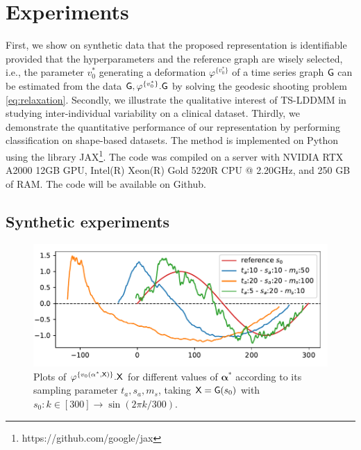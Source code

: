     




\section{Experiments}
\label{section:experiments}



First, we show on synthetic data that the proposed representation is identifiable provided that the hyperparameters and the reference graph are wisely selected, i.e.,
 the parameter $v_0^*$ generating a deformation $\varphi^{\{v_0^*\}}$ of a time series graph $\mathsf{G}$ can be estimated from the data $\mathsf{G},\varphi^{\{v_0^*\}}.\mathsf{G}$ by solving the geodesic shooting problem \eqref{eq:relaxation}.
 Secondly, we illustrate the qualitative interest of TS-LDDMM in studying inter-individual variability on a clinical dataset.
  Thirdly, we demonstrate the quantitative performance of our representation by performing classification on shape-based datasets.
  The method is implemented on Python using the library JAX\footnote{https://github.com/google/jax}. The code was compiled on a server with NVIDIA RTX A2000 12GB GPU, Intel(R) Xeon(R) Gold 5220R CPU @ 2.20GHz, and 250 GB of RAM. The code will be available on Github.
\subsection{Synthetic experiments}
\begin{figure}[t]
    \centering
    \includegraphics[width=0.5\linewidth]{pictures/samples.pdf}
    \vspace{-2.5em}
    \caption{Plots of $\varphi^{\{v_0(\mathbf{\alpha}^*,\mathsf{X})\}}.\mathsf{X}$ for different values of $\mathbf{\alpha}^*$ according to its sampling parameter $t_a,s_a,m_s $, taking $\mathsf{X}=\mathsf{G}(s_0)$ with $s_0:k\in [300]\to \sin(2\pi k/300) $.}
    \label{fig:exemple_synthetic}
    \vspace{-1em}
\end{figure}

